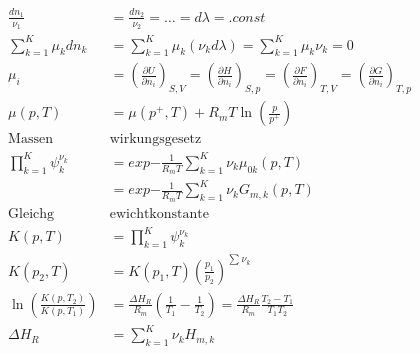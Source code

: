 \documentclass[twocolumn]{article}
\begin{document}
\begin{multicols}{2}
	\begin{align*}
		\frac{dn_1}{\nu_1} &= \frac{dn_2}{\nu_2} = \ldots = d\lambda = .const \\
		\sum_{k=1}^K \mu_k dn_k &= \sum_{k=1}^{K} \mu_k(\nu_kd\lambda) = \sum_{k=1}^{K} \mu_k \nu_k = 0 \\
		\mu_i &= \left(\frac{\partial U}{\partial n_i}\right)_{S,V}  = \left(\frac{\partial H}{\partial n_i}\right)_{S,p} = \left(\frac{\partial F}{\partial n_i}\right)_{T,V} = \left(\frac{\partial G}{\partial n_i}\right)_{T,p} \\
		\mu (p,T) &= \mu (p^+, T) + R_mT\ln \left( \frac{p}{p^+}\right) \\
		\text{Massen}&\text{wirkungsgesetz} \\
		\prod_{k=1}^K \psi_k^{\nu_k} &= exp{- \frac{1}{R_mT} \sum_{k=1}^{K} \nu_k \mu_{0k}(p,T)} \\
		&= exp{- \frac{1}{R_mT} \sum_{k=1}^{K} \nu_k G_{m,k}(p,T)} \\
		\text{Gleichg}&\text{ewichtkonstante} \\
		K(p,T) &= \prod_{k=1}^K \psi_k^{\nu_k} \\
		K(p_2,T) &= K(p_1,T) \left(\frac{p_1}{p_2}\right)^{\sum_{}^{} \nu_k} \\
		\ln \left(\frac{K(p,T_2)}{K(p,T_1)}\right) &= \frac{\Delta H_R}{R_m}\left(\frac{1}{T_1} - \frac{1}{T_2}\right) = \frac{\Delta H_R}{R_m} \frac{T_2-T_1}{T_1T_2} \\
		\Delta H_R &= \sum_{k=1}^{K} \nu_k H_{m,k} \\
	\end{align*}

\end{multicols}
\end{document}
